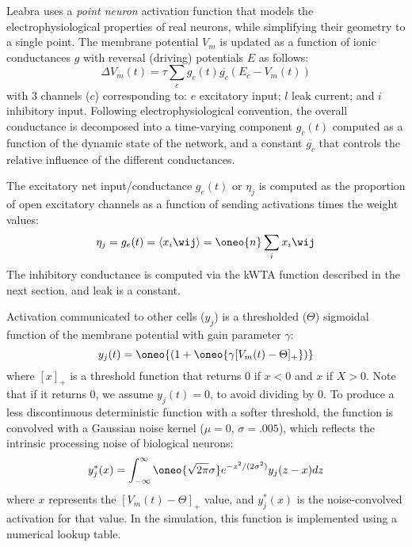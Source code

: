 Leabra uses a {\em point neuron} activation function that models the
electrophysiological properties of real neurons, while simplifying
their geometry to a single point.  The membrane potential $V_m$ is
updated as a function of ionic conductances $g$ with reversal
(driving) potentials $E$ as follows:
\begin{equation}
  \Delta V_m(t) = \tau \sum_c g_c(t) \overline{g_c} (E_c - V_m(t))
  \label{eq.vm}
\end{equation}
with 3 channels ($c$) corresponding to: $e$ excitatory input; $l$ leak
current; and $i$ inhibitory input.  Following electrophysiological
convention, the overall conductance is decomposed into a time-varying
component $g_c(t)$ computed as a function of the dynamic state of the
network, and a constant $\overline{g_c}$ that controls the relative
influence of the different conductances.

The excitatory net input/conductance $g_e(t)$ or $\eta_j$ is computed
as the proportion of open excitatory channels as a function of sending
activations times the weight values:
\begin{equation}
  \eta_j = g_e(t) = \langle x_i \wij \rangle = \oneo{n} \sum_i x_i \wij
  \label{eq.net_in_avg}
\end{equation}
The inhibitory conductance is computed via the kWTA function described
in the next section, and leak is a constant.

Activation communicated to other cells ($y_j$) is a thresholded
($\Theta$) sigmoidal function of the membrane potential with gain
parameter $\gamma$:
\begin{equation}
  y_j(t) = \oneo{\left(1 + \oneo{\gamma [V_m(t) - \Theta]_+} \right)}
\end{equation}
where $[x]_+$ is a threshold function that returns 0 if $x<0$ and $x$
if $X>0$.  Note that if it returns 0, we assume $y_j(t) = 0$, to avoid
dividing by 0.  To produce a less discontinuous deterministic
function with a softer threshold, the function is convolved with a
Gaussian noise kernel ($\mu=0$, $\sigma=.005$), which reflects the
intrinsic processing noise of biological neurons:
\begin{equation}
  y^*_j(x) = \int_{-\infty}^{\infty} \oneo{\sqrt{2 \pi} \sigma}
  e^{-z^2/(2 \sigma^2)} y_j(z-x) dz
  \label{eq.conv}
\end{equation}
where $x$ represents the $[V_m(t) - \Theta]_+$ value, and $y^*_j(x)$
is the noise-convolved activation for that value.  In the simulation,
this function is implemented using a numerical lookup table.

